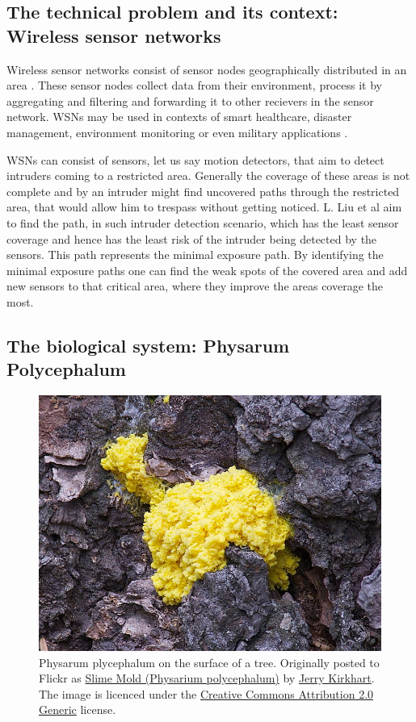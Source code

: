 \documentclass[cameraready]{IWORK2014}
\begin{document}
\subsection{The technical problem and its context: Wireless sensor networks}
Wireless sensor networks consist of sensor nodes geographically distributed in an area \cite{nazi2013robust}. These sensor nodes collect data from their environment, process it by aggregating and filtering and forwarding it to other recievers in the sensor network. WSNs may be used in contexts of smart healthcare, disaster management, environment monitoring \cite{nazi2013robust} or even military applications \cite{liu2012physarum}.

WSNs can consist of sensors, let us say motion detectors, that aim to detect intruders coming to a restricted area. Generally the coverage of these areas is not complete and by an intruder might find uncovered paths through the restricted area, that would allow him to trespass without getting noticed. L. Liu et al \cite{liu2012physarum} aim to find the path, in such intruder detection scenario, which has the least sensor coverage and hence has the least risk of the intruder being detected by the sensors. This path represents the minimal exposure path. By identifying the minimal exposure paths one can find the weak spots of the covered area and add new sensors to that critical area, where they improve the areas coverage the most.

\subsection{The biological system: Physarum Polycephalum}

\begin{figure}
    \centering
    \includegraphics[width=0.8\linewidth]{physarum.jpg}
    \caption{ Physarum plycephalum on the surface of a tree. Originally posted to Flickr as \href{http://flickr.com/photos/33466410@N00/4988821189}{Slime Mold (Physarium polycephalum)} by \href{http://flickr.com/people/33466410@N00}{Jerry Kirkhart}. The image is licenced under the \href{http://creativecommons.org/licenses/by/2.0/deed.en}{Creative Commons Attribution 2.0 Generic} license.}
    \label{fig:physarum}
\end{figure}
\end{document}
